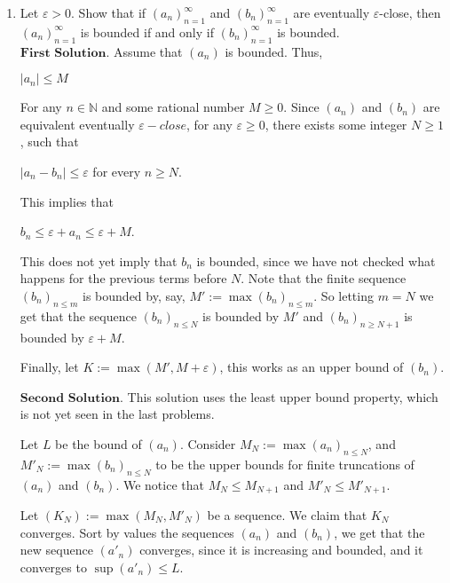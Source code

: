 \documentclass{article}
\theoremstyle{remark}
\begin{document}
\begin{enumerate}
        \item Let \( \varepsilon > 0 \). Show that if \( (a_n)_{n=1}^{\infty} \) and \( (b_n)_{n=1}^{\infty} \) are eventually \( \varepsilon \)-close, then \( (a_n)_{n=1}^{\infty} \) is bounded if and only if \( (b_n)_{n=1}^{\infty} \) is bounded.\\
        $\textbf{First Solution.}$ 
        Assume that $(a_n)$ is bounded. Thus,
        \begin{center}
            $\vert a_n \vert \leq M$
        \end{center}
        For any $n \in \mathbb{N}$ and some rational number $M \geq 0$.
        Since $(a_n)$ and $(b_n)$ are equivalent eventually $\varepsilon-close$,
        for any $\varepsilon \geq 0$, there exists some integer $N\geq 1$, such that 
        \begin{center}
            $\vert a_n - b_n \vert \leq \varepsilon$ for every $n \geq N$.
        \end{center}
        This implies that
        \begin{center}
            $b_n \leq \varepsilon + a_n \leq \varepsilon + M$.
        \end{center}
        This does not yet imply that $b_n$ is bounded, since we have not checked what happens for the previous terms before $N$.
        Note that the finite sequence $(b_n)_{n\leq m}$ is bounded by, say, $M' := \max{(b_n)_{n\leq m}}$.
        So letting $m = N$ we get that the sequence $(b_n)_{n\leq N}$ is bounded by $M'$
        and $(b_n)_{n\geq N+1}$ is bounded by $\varepsilon + M$.
        
        Finally, let $K := \max(M',M+\varepsilon)$, this works as an upper bound of $(b_n)$.

        $\textbf{Second Solution.}$
        This solution uses the least upper bound property, which is not yet seen in the last problems.
        
        Let $L$ be the bound of $(a_n)$.
        Consider $M_N := \max{(a_n)_{n\leq N}}$, and $M'_N := \max{(b_n)_{n\leq N}}$ to be the upper bounds for finite truncations
        of $(a_n)$ and $(b_n)$. We notice that $M_N \leq M_{N+1}$ and $M'_N \leq M'_{N+1}$.

        Let $(K_N) := \max{(M_N, M'_N)}$ be a sequence. We claim that $K_N$ converges.
        Sort by values the sequences $(a_n)$ and $(b_n)$, we get that the new sequence $(a'_n)$ converges, since
        it is increasing and bounded, and it converges to $\sup (a'_n) \leq L$.


\end{enumerate}
\end{document}
